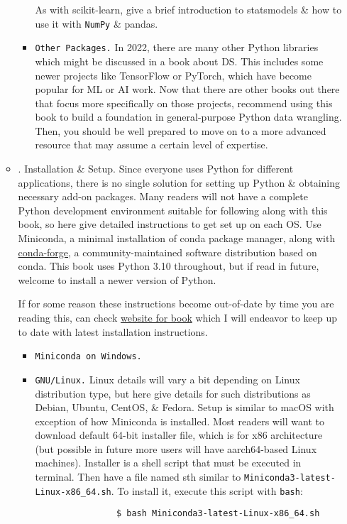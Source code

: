 \documentclass{article}
\begin{document}
\begin{itemize}
\begin{itemize}
\begin{itemize}
			As with scikit-learn, give a brief introduction to statsmodels \& how to use it with {\tt NumPy} \& pandas.
			\item {\tt Other Packages.} In 2022, there are many other Python libraries which might be discussed in a book about DS. This includes some newer projects like TensorFlow or PyTorch, which have become popular for ML or AI work. Now that there are other books out there that focus more specifically on those projects, recommend using this book to build a foundation in general-purpose Python data wrangling. Then, you should be well prepared to move on to a more advanced resource that may assume a certain level of expertise.
		\end{itemize}
		\item {. Installation \& Setup.} Since everyone uses Python for different applications, there is no single solution for setting up Python \& obtaining necessary add-on packages. Many readers will not have a complete Python development environment suitable for following along with this book, so here give detailed instructions to get set up on each OS. Use Miniconda, a minimal installation of conda package manager, along with \href{https://conda-forge.org}{conda-forge}, a community-maintained software distribution based on conda. This book uses Python 3.10 throughout, but if read in future, welcome to install a newer version of Python.
		
		If for some reason these instructions become out-of-date by time you are reading this, can check \href{https://wesmckinney.com/book}{website for book} which I will endeavor to keep up to date with latest installation instructions.
		\begin{itemize}
			\item {\tt Miniconda on Windows.}
			\item {\tt GNU{\tt/}Linux.} Linux details will vary a bit depending on Linux distribution type, but here give details for such distributions as Debian, Ubuntu, CentOS, \& Fedora. Setup is similar to macOS with exception of how Miniconda is installed. Most readers will want to download default 64-bit installer file, which is for x86 architecture (but possible in future more users will have aarch64-based Linux machines). Installer is a shell script that must be executed in terminal. Then have a file named sth similar to \verb|Miniconda3-latest-Linux-x86_64.sh|. To install it, execute this script with {\tt bash}:
			\begin{verbatim}
				$ bash Miniconda3-latest-Linux-x86_64.sh
			\end{verbatim}
			

\end{itemize}
\end{itemize}
\end{itemize}
\end{document}
